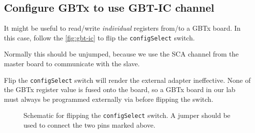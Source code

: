 \subsection{Configure GBTx to use GBT-IC channel}
It might be useful to read/write \emph{individual} registers from/to a GBTx
board.
In this case, follow the \autoref{fig:gbt-ic} to flip the \texttt{configSelect}
switch.

\begin{leftbar}
    Normally this should be unjumped, because we use the SCA \itwoc channel from
    the master board to communicate with the slave.
\end{leftbar}

\begin{leftbar}
    Flip the \texttt{configSelect} switch will render the external \itwoc
    adapter ineffective.
    None of the GBTx register value is fused onto the board, so a GBTx board in
    our lab must always be programmed externally via \itwoc before flipping the
    switch.
\end{leftbar}

\begin{figure}[!ht]
\centering
{}
\caption{
    Schematic for flipping the \texttt{configSelect} switch. A jumper should be
    used to connect the two pins marked above.
}
\label{fig:gbt-ic}
\end{figure}
